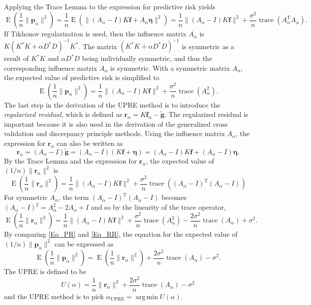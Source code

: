 \documentclass[12pt]{article}
\newcommand{\gnoise}{\widetilde{\mathbf{g}}}
\newcommand{\kmat}{K}	%
\newcommand{\fdis}{\mathbf{f}}
\newcommand{\trans}{\mathrm{T}}	%
\newcommand{\ctrans}{*}	%
\newcommand{\trace}{\operatorname{trace}}	%
\newcommand{\regparam}{\alpha}
\newcommand{\freg}{\fdis_{\regparam}}	%
\newcommand{\argmin}{\operatorname{arg\,min}} %
\newcommand{\noiseSD}{\sigma}	%
\newcommand{\noise}{\bm{\eta}}	%
\newcommand{\E}{\operatorname{E}}	%
\newcommand{\PE}{\mathbf{p}_{\regparam}}	%
\newcommand{\regres}{\mathbf{r}_{\regparam}}	%
\newcommand{\A}{A_{\regparam}}	%
\newcommand{\U}{U}	%
\begin{document}
\noindent Applying the Trace Lemma to the expression for predictive risk yields
\[\E\left(\frac{1}{n}\|\PE\|^2\right) = \frac{1}{n}\E\left(\|(\A-I)\kmat\fdis + \A\noise\|^2\right) = \frac{1}{n}\|(\A-I)\kmat\fdis\|^2 + \frac{\noiseSD^2}{n}\trace({\A^\trans}\A).\]
If Tikhonov regularization is used, then the influence matrix $\A$ is $\kmat(\kmat^\ctrans\kmat + \regparam{D^\ctrans}D)^{-1}\kmat^\ctrans$. The matrix $(\kmat^\ctrans\kmat + \regparam{D^\ctrans}D)^{-1}$ is symmetric as a result of $\kmat^\ctrans\kmat$ and $\regparam{D^\ctrans}D$ being individually symmetric, and thus the corresponding influence matrix $\A$ is symmetric.  With a symmetric matrix $\A$, the expected value of predictive risk is simplified to
\begin{equation}
\label{Eq_PR}
\E\left(\frac{1}{n}\|\PE\|^2\right) = \frac{1}{n}\|(\A-I)\kmat\fdis\|^2 + \frac{\noiseSD^2}{n}\trace(\A^2).
\end{equation}
\indent The last step in the derivation of the UPRE method is to introduce the \textit{regularized residual}, which is defined as $\regres = \kmat\freg - \gnoise$. The regularized residual is important because it is also used in the derivation of the generalized cross validation and discrepancy principle methods. Using the influence matrix $\A$, the expression for $\regres$ can also be written as
\[\regres = (\A-I)\gnoise = (\A-I)(\kmat\fdis + \noise) = (\A-I)\kmat\fdis + (\A-I)\noise.\]
By the Trace Lemma and the expression for $\regres$, the expected value of $(1/n)\|\regres\|^2$ is
\[\E\left(\frac{1}{n}\|\regres\|^2\right) = \frac{1}{n}\|(\A-I)\kmat\fdis\|^2 + \frac{\noiseSD^2}{n}\trace({(\A-I)^\trans}(\A-I))\]
For symmetric $\A$, the term $(\A-I)^\trans(\A-I)$ becomes $(\A-I)^2 = \A^2 - 2\A + I$ and so by the linearity of the trace operator,
\begin{equation}
\label{Eq_RR}
\E\left(\frac{1}{n}\|\regres\|^2\right) = \frac{1}{n}\|(\A-I)\kmat\fdis\|^2 + \frac{\noiseSD^2}{n}\trace(\A^2) - \frac{2\noiseSD^2}{n}\trace(\A) + \noiseSD^2.
\end{equation}
By comparing \eqref{Eq_PR} and \eqref{Eq_RR}, the equation for the expected value of $(1/n)\|\PE\|^2$ can be expressed as
\[\E\left(\frac{1}{n}\|\PE\|^2\right) = \E\left(\frac{1}{n}\|\regres\|^2\right) + \frac{2\noiseSD^2}{n}\trace(\A) - \noiseSD^2.\]
The UPRE is defined to be
\begin{equation}
\label{Eq_UPRE}
\U(\regparam) = \frac{1}{n}\|\regres\|^2 + \frac{2\noiseSD^2}{n}\trace(\A) - \noiseSD^2
\end{equation}
and the UPRE method is to pick $\regparam_{\text{UPRE}} = \argmin \U(\regparam)$. \par 
\end{document}
